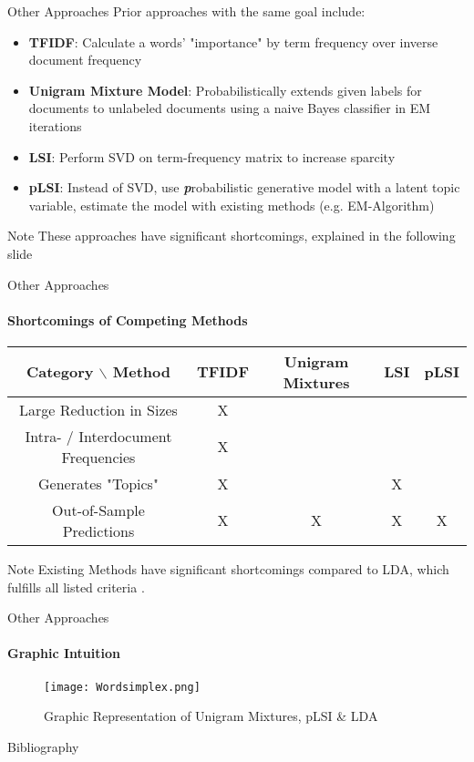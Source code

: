 \documentclass[aspectratio=169]{beamer}
\begin{document}
\begin{frame}{Other Approaches}
  Prior approaches with the same goal include:
  \begin{itemize}
    \item \textbf{TFIDF}: Calculate a words' "importance" by term frequency over inverse document frequency \cite{TFIDF}
    \item \textbf{Unigram Mixture Model}: Probabilistically extends given labels for documents to unlabeled documents using a naive Bayes classifier in EM iterations \cite{Unigram}
    \item \textbf{LSI}: Perform SVD on term-frequency matrix to increase sparcity \cite{LSI}
    \item \textbf{pLSI}: Instead of SVD, use \textbf{\textit{p}}robabilistic generative model with a latent topic variable, estimate the model with existing methods (e.g. EM-Algorithm)\cite{PLSI}
  \end{itemize}  
  \begin{block}{Note}
    These approaches have significant shortcomings, explained in the following slide
  \end{block}
\end{frame}

\begin{frame}{Other Approaches}
  \framesubtitle{Shortcomings of Competing Methods}
  \begin{center}
    \begin{tabular}{|c|c|c|c|c|}
      \hline
      Category $\backslash$ Method & TFIDF & Unigram Mixtures & LSI & pLSI \\
      \hline
      Large Reduction in Sizes & X &  &  & \\
      \hline
      Intra- / Interdocument Frequencies & X &  &  &  \\
      \hline
      Generates "Topics" & X & & X &  \\
      \hline
      Out-of-Sample Predictions & X & X & X & X \\
      \hline
    \end{tabular}
  \end{center}
  \begin{block}{Note}
    Existing Methods have significant shortcomings compared to LDA, which fulfills all listed criteria \cite{LDA}.
  \end{block}
\end{frame}

\begin{frame}{Other Approaches}
  \framesubtitle{Graphic Intuition}
  \begin{figure}
    \begin{center}
      \texttt{[image: Wordsimplex.png]}
    \end{center}
    \caption{Graphic Representation of Unigram Mixtures, pLSI \& LDA \cite{LDA}}
  \end{figure}
\end{frame}

\AtNextBibliography{\small}
\begin{frame}[allowframebreaks]{Bibliography}
  \printbibliography[heading=none]
\end{frame}
  
\end{document}
